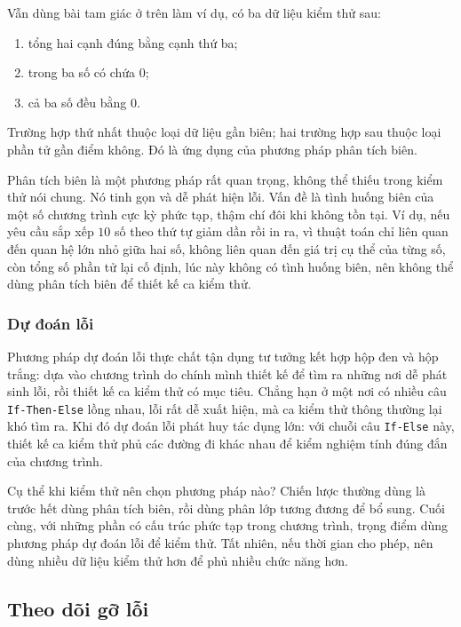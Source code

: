 \documentclass[11pt]{article}
\begin{document}
Vẫn dùng bài tam giác ở trên làm ví dụ, có ba dữ liệu kiểm thử sau:
\begin{enumerate}
  \item tổng hai cạnh đúng bằng cạnh thứ ba;
  \item trong ba số có chứa \(0\);
  \item cả ba số đều bằng \(0\).
\end{enumerate}
Trường hợp thứ nhất thuộc loại dữ liệu gần biên; hai trường hợp sau thuộc
loại phần tử gần điểm không. Đó là ứng dụng của phương pháp phân tích biên.

Phân tích biên là một phương pháp rất quan trọng, không thể thiếu trong kiểm
thử nói chung. Nó tinh gọn và dễ phát hiện lỗi. Vấn đề là tình huống biên của
một số chương trình cực kỳ phức tạp, thậm chí đôi khi không tồn tại. Ví dụ,
nếu yêu cầu sắp xếp \(10\) số theo thứ tự giảm dần rồi in ra, vì thuật toán
chỉ liên quan đến quan hệ lớn nhỏ giữa hai số, không liên quan đến giá trị cụ
thể của từng số, còn tổng số phần tử lại cố định, lúc này không có tình huống
biên, nên không thể dùng phân tích biên để thiết kế ca kiểm thử.

\subsubsection{Dự đoán lỗi}

Phương pháp dự đoán lỗi thực chất tận dụng tư tưởng kết hợp hộp đen và hộp
trắng: dựa vào chương trình do chính mình thiết kế để tìm ra những nơi dễ
phát sinh lỗi, rồi thiết kế ca kiểm thử có mục tiêu. Chẳng hạn ở một nơi có
nhiều câu \texttt{If-Then-Else} lồng nhau, lỗi rất dễ xuất hiện, mà ca kiểm
thử thông thường lại khó tìm ra. Khi đó dự đoán lỗi phát huy tác dụng lớn:
với chuỗi câu \texttt{If-Else} này, thiết kế ca kiểm thử phủ các đường đi
khác nhau để kiểm nghiệm tính đúng đắn của chương trình.

Cụ thể khi kiểm thử nên chọn phương pháp nào? Chiến lược thường dùng là trước
hết dùng phân tích biên, rồi dùng phân lớp tương đương để bổ sung. Cuối cùng,
với những phần có cấu trúc phức tạp trong chương trình, trọng điểm dùng
phương pháp dự đoán lỗi để kiểm thử. Tất nhiên, nếu thời gian cho phép, nên
dùng nhiều dữ liệu kiểm thử hơn để phủ nhiều chức năng hơn.

\subsection{Theo dõi gỡ lỗi}
\end{document}
